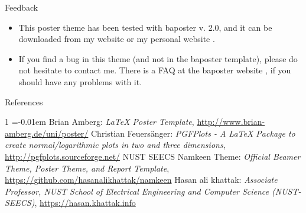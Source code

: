 \documentclass[a0paper,portrait]{baposter}
\begin{document}
\begin{poster}
\begin{posterbox}[name=feedback,column=2,below=problems]{Feedback}
  \begin{itemize}
    \item This poster theme has been tested with baposter v. 2.0, and it can be downloaded from my website \cite{namkeen} or my personal website \cite{hasan}.
    \item If you find a bug in this theme (and not in the baposter template), please do not hesitate to contact me. There is a FAQ at the baposter website \cite{baposter}, if you should have any problems with it.
  \end{itemize}
\end{posterbox}

\begin{posterbox}[name=refs,column=2,below=feedback,above=bottom]{References}


\begin{thebibliography}{1}%
\itemsep=-0.01em%
\setlength{\baselineskip}{0.4em}%
 Brian Amberg: \emph{LaTeX Poster Template}, \url{http://www.brian-amberg.de/uni/poster/} 
 Christian Feuersänger: \emph{PGFPlots - A LaTeX Package to create normal/logarithmic plots in two and three dimensions}, \url{http://pgfplots.sourceforge.net/} 
 NUST SEECS Namkeen Theme: \emph{Official Beamer Theme, Poster Theme, and Report Template}, \url{https://github.com/hasanalikhattak/namkeen}
 Hasan ali khattak: \emph{Associate Professor, NUST School of Electrical Engineering and Computer Science (NUST-SEECS)}, \url{https://hasan.khattak.info}
\end{thebibliography}


%  
%   
\end{posterbox}

\end{poster}
\end{document}
